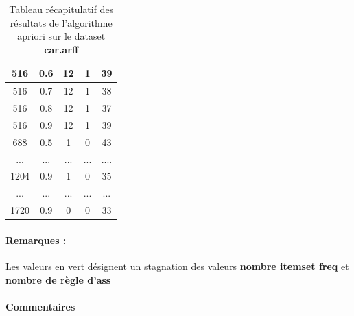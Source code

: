\begin{table}[H]
\begin{tabular}{|c|c|c|c|c|}
					516             & 0.6              & 12                           & 1                              & 39             \\ \hline
					516             & 0.7              & 12                           & 1                              & 38             \\ \hline
					516             & 0.8              & 12                           & 1                              & 37             \\ \hline
					516             & 0.9              & 12                           & 1                              & 39             \\ \hline
					688             & 0.5              & 1                            & 0                              & 43             \\ \hline
					\rowcolor[HTML]{9AFF99} 
					...             & ...              & ...                          & ...                            & ....           \\ \hline
					1204            & 0.9              & 1                            & 0                              & 35             \\ \hline
					\rowcolor[HTML]{9AFF99} 
					...             & ...              & ...                          & ...                            & ...            \\ \hline
					1720            & 0.9              & 0                            & 0                              & 33             \\ \hline
				\end{tabular}
				\caption{Tableau récapitulatif des résultats de l'algorithme apriori sur le dataset \textbf{car.arff}}
				\label{my-label}
			\end{table}
			\paragraph{Remarques :} Les valeurs en vert désignent un stagnation des valeurs \textbf{nombre itemset freq} et \textbf{nombre de règle d'ass}
		\paragraph{Commentaires}
